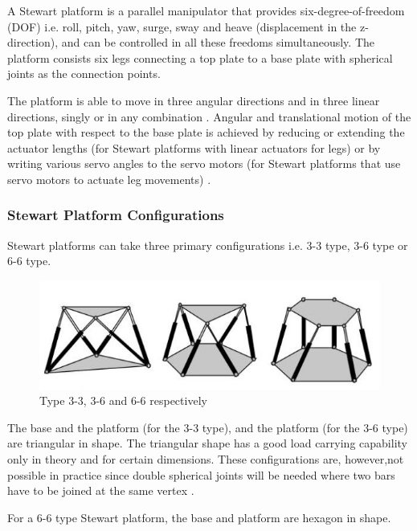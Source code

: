 A Stewart platform is a parallel manipulator that provides six-degree-of-freedom (DOF) i.e. roll, pitch, yaw, surge, sway and heave (displacement in the z-direction), and can be controlled in all these freedoms simultaneously.
The platform consists six legs connecting a top plate to a base plate with spherical joints as the connection points.

The platform is able to move in three angular directions and in three linear directions, singly or in any combination \cite{stewart1965platform}. Angular and translational motion of the top plate with
respect to the base plate is achieved by reducing or extending the actuator lengths (for Stewart platforms with linear actuators for legs) or by writing various servo angles to the servo motors
(for Stewart platforms that use servo motors to actuate leg movements) \cite{iqbal_dynamic_2008}.

\subsubsection{Stewart Platform Configurations}
Stewart platforms can take three primary configurations i.e. 3-3 type, 3-6 type or 6-6 type.
\begin{center}
	\begin{figure}[H]
		\centering
		\includegraphics{Figures/stewart}
		\caption[Configurations]{Type 3-3, 3-6 and 6-6 respectively
			\cite{fernandes_design_nodate}}
	\end{figure}
\end{center}
The base and the platform (for the 3-3 type), and the platform (for the 3-6 type) are triangular in shape. The triangular shape has a good load carrying capability only in theory and for certain dimensions. These configurations are, however,not possible in practice since double spherical joints will be needed where two bars have to be joined at the same vertex
\cite{fernandes_design_nodate}.

For a 6-6 type Stewart platform, the base and platform are hexagon in shape.

